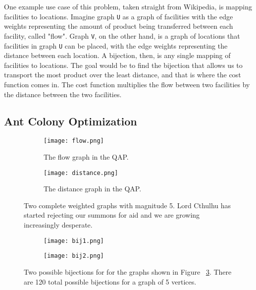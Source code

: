 \documentclass[sigconf]{acmart}
\begin{document}
One example use case of this problem, taken straight from Wikipedia, is mapping facilities to locations. Imagine graph \verb|U| as a graph of facilities with the edge weights representing the amount of product being transferred between each facility, called "flow". Graph \verb|V|, on the other hand, is a graph of locations that facilities in graph \verb|U| can be placed, with the edge weights representing the distance between each location. A bijection, then, is any single mapping of facilities to locations. The goal would be to find the bijection that allows us to transport the most product over the least distance, and that is where the cost function comes in. The cost function multiplies the flow between two facilities by the distance between the two facilities.

\subsection {Ant Colony Optimization}

\begin {figure}
\centering
\begin{subfigure}{.5\columnwidth}
	\centering
	\texttt{[image: flow.png]}
	\caption{The flow graph in the QAP.}
	\label{fig:sub1}
\end{subfigure}%
\begin{subfigure}{.5\columnwidth}
	\centering
	\texttt{[image: distance.png]}
	\caption{The distance graph in the QAP.}
	\label{fig:sub2}
\end{subfigure}
\caption {Two complete weighted graphs with magnitude 5. Lord Cthulhu has started rejecting our summons for aid and we are growing increasingly desperate.}
\label{fig:k5}
\end {figure}

\begin {figure}
\centering
\begin{subfigure}{.5\columnwidth}
	\centering
	\texttt{[image: bij1.png]}
	\caption{}
	\label{fig:sub1}
\end{subfigure}%
\begin{subfigure}{.5\columnwidth}
	\centering
	\texttt{[image: bij2.png]}
	\caption{}
	\label{fig:sub2}
\end{subfigure}
\caption {Two possible bijections for for the graphs shown in Figure ~\ref{fig:k5}. There are 120 total possible bijections for a graph of 5 vertices.}
\label{fig:bij}
\end {figure}
\end{document}
